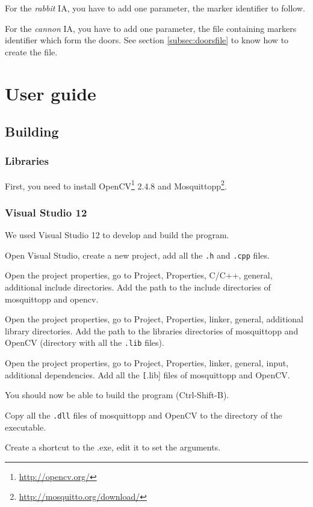 \documentclass[a4paper,11pt]{report}
\begin{document}
For the \emph{rabbit} IA, you have to add one parameter, the marker identifier
to follow.

For the \emph{cannon} IA, you have to add one parameter, the file containing
markers identifier which form the doors. See section \ref{subsec:doorsfile} to
know how to create the file.

\chapter{User guide}

\section{Building}

\subsection{Libraries}

First, you need to install OpenCV\footnote{\url{http://opencv.org/}} 2.4.8 and
Mosquittopp\footnote{\url{http://mosquitto.org/download/}}.

\subsection{Visual Studio 12}

We used Visual Studio 12 to develop and build the program.

Open Visual Studio, create a new project, add all the \texttt{.h} and
\texttt{.cpp} files.

Open the project properties, go to Project, Properties, C/C++, general,
additional include directories. Add the path to the include directories of
mosquittopp and opencv.

Open the project properties, go to Project, Properties, linker, general,
additional library directories. Add the path to the libraries directories of
mosquittopp and OpenCV (directory with all the \texttt{.lib} files).

Open the project properties, go to Project, Properties, linker, general, input,
additional dependencies. Add all the \texttt[.lib] files of mosquittopp and
OpenCV.

You should now be able to build the program (Ctrl-Shift-B).

Copy all the \texttt{.dll} files of mosquittopp and OpenCV to the directory of
the executable.

Create a shortcut to the .exe, edit it to set the arguments.
\end{document}
